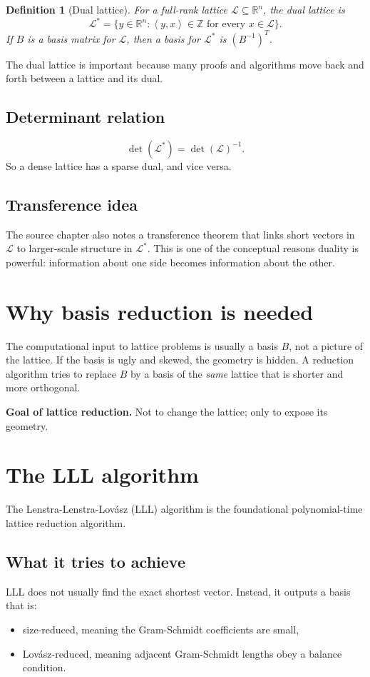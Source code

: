 \documentclass[11pt]{article}
\newtheorem{definition}[theorem]{Definition}
\newenvironment{greenboxenv}{%
  \def\FrameCommand{\fboxrule=0.8pt \fboxsep=8pt \colorbox{greenbox}}%
  \MakeFramed{\advance\hsize-\width \FrameRestore}}{\endMakeFramed}
\newcommand{\R}{\mathbb{R}}
\newcommand{\Z}{\mathbb{Z}}
\newcommand{\ip}[2]{\left\langle #1,#2 \right\rangle}
\newcommand{\calL}{\mathcal{L}}
\begin{document}
\begin{definition}[Dual lattice]
For a full-rank lattice $\calL\subseteq \R^n$, the dual lattice is
\[
\calL^* = \{y\in \R^n : \ip{y}{x}\in \Z \text{ for every } x\in \calL\}.
\]
If $B$ is a basis matrix for $\calL$, then a basis for $\calL^*$ is $(B^{-1})^T$.
\end{definition}

The dual lattice is important because many proofs and algorithms move back and forth between a lattice and its dual.

\subsection{Determinant relation}
\[
\det(\calL^*)=\det(\calL)^{-1}.
\]
So a dense lattice has a sparse dual, and vice versa.

\subsection{Transference idea}
The source chapter also notes a transference theorem that links short vectors in $\calL$ to larger-scale structure in $\calL^*$. This is one of the conceptual reasons duality is powerful: information about one side becomes information about the other.

\section{Why basis reduction is needed}

The computational input to lattice problems is usually a basis $B$, not a picture of the lattice. If the basis is ugly and skewed, the geometry is hidden. A reduction algorithm tries to replace $B$ by a basis of the \emph{same} lattice that is shorter and more orthogonal.

\begin{greenboxenv}
\textbf{Goal of lattice reduction.} Not to change the lattice; only to expose its geometry.
\end{greenboxenv}

\section{The LLL algorithm}

The Lenstra-Lenstra-Lov\'asz (LLL) algorithm is the foundational polynomial-time lattice reduction algorithm.

\subsection{What it tries to achieve}
LLL does not usually find the exact shortest vector. Instead, it outputs a basis that is:
\begin{itemize}
    \item size-reduced, meaning the Gram-Schmidt coefficients are small,
    \item Lov\'asz-reduced, meaning adjacent Gram-Schmidt lengths obey a balance condition.
\end{itemize}
\end{document}

